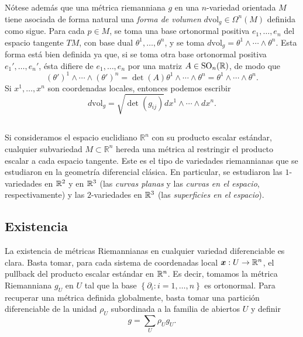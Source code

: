 \documentclass[11pt,a4paper]{amsbook}
\theoremstyle{remark} \newtheorem{rmk}[subsection]{Observación}
\theoremstyle{definition} \newtheorem{defn}[subsection]{Definición}
\theoremstyle{definition} \newtheorem{ex}[subsection]{Ejemplo}
\theoremstyle{definition} \newtheorem{ej}[subsection]{Ejercicio}
\begin{document}
Nótese además que una métrica riemanniana $g$ en una $n$-variedad orientada $M$ tiene asociada de forma natural una \emph{forma de volumen} $d \mathrm{vol}_g \in \Omega^n(M)$ definida como sigue. Para cada $p\in M$, se toma una base ortonormal positiva $e_1,\dots,e_n$ del espacio tangente $TM$, con base dual $\theta^1,\dots,\theta^n$, y se toma $d\mathrm{vol}_g=\theta^1\wedge \cdots \wedge \theta^n$. Esta forma está bien definida ya que, si se toma otra base ortonormal positiva $e_1',\dots,e_n'$, ésta difiere de $e_1,\dots,e_n$ por una matriz $A \in \mathrm{SO}_n(\mathbb R)$, de modo que \[(\theta')^1\wedge \cdots \wedge (\theta')^n=\det(A) \theta^1\wedge \cdots \wedge \theta^n = \theta^1\wedge \cdots \wedge \theta^n.\]
Si $x^1,\dots,x^n$ son coordenadas locales, entonces podemos escribir
\begin{equation*}
d \mathrm{vol}_g = \sqrt{\det(g_{ij})} dx^1\wedge \cdots \wedge dx^n.
\end{equation*}

\subsection{} Si consideramos el espacio euclidiano $\mathbb{R}^n$ con su producto escalar estándar, cualquier subvariedad $M\subset \mathbb{R}^n$ hereda una métrica al restringir el producto escalar a cada espacio tangente. Este es el tipo de variedades riemannianas que se estudiaron en la geometría diferencial clásica. En particular, se estudiaron las $1$-variedades en $\mathbb R^2$ y en $\mathbb R^3$ (las \emph{curvas planas} y las \emph{curvas en el espacio}, respectivamente) y las $2$-variedades en $\mathbb R^3$ (las \emph{superficies en el espacio}).


\subsection{Existencia} La existencia de métricas Riemannianas en cualquier variedad diferenciable es clara. Basta tomar, para cada sistema de coordenadas local $\bm{x}:U\rightarrow \mathbb R^n$, el pullback del producto escalar estándar en $\mathbb R^n$. Es decir, tomamos la métrica Riemanniana $g_U$ en $U$ tal que la base $\left\{ \partial_i:i=1,\dots,n \right\}$ es ortonormal. Para recuperar una métrica definida globalmente, basta tomar una partición diferenciable de la unidad $\rho_U$ subordinada a la familia de abiertos $U$ y definir
\begin{equation*}
g = \sum_{U} \rho_U g_U.
\end{equation*}
\end{document}

